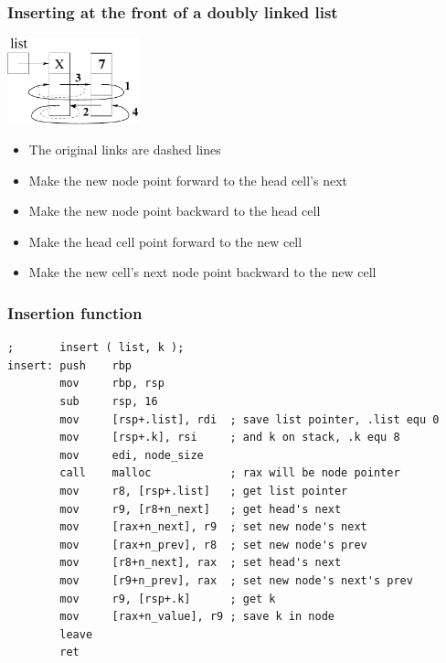 \documentclass{beamer}
\begin{document}
\begin{frame}[fragile]
    \frametitle{Inserting at the front of a doubly linked list}
\begin{center}
\centering\includegraphics[width=1.5in]{insert_doubly_linked_list.pdf}
\end{center}
    \begin{itemize}
        \item The original links are dashed lines
        \item Make the new node point forward to the head cell's next
        \item Make the new node point backward to the head cell
        \item Make the head cell point forward to the new cell
        \item Make the new cell's next node point backward to the new cell
    \end{itemize}
\end{frame}

\begin{frame}[fragile]
    \frametitle{Insertion function}
\small
\begin{verbatim}
;       insert ( list, k );
insert: push    rbp
        mov     rbp, rsp
        sub     rsp, 16
        mov     [rsp+.list], rdi  ; save list pointer, .list equ 0
        mov     [rsp+.k], rsi     ; and k on stack, .k equ 8
        mov     edi, node_size
        call    malloc            ; rax will be node pointer
        mov     r8, [rsp+.list]   ; get list pointer
        mov     r9, [r8+n_next]   ; get head's next
        mov     [rax+n_next], r9  ; set new node's next
        mov     [rax+n_prev], r8  ; set new node's prev
        mov     [r8+n_next], rax  ; set head's next
        mov     [r9+n_prev], rax  ; set new node's next's prev
        mov     r9, [rsp+.k]      ; get k
        mov     [rax+n_value], r9 ; save k in node
        leave
        ret
\end{verbatim}
\end{frame}
\end{document}
